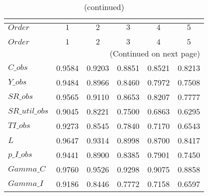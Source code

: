  
\begin{center}
\begin{longtable}{lccccc} 
\caption{COEFFICIENTS OF AUTOCORRELATION}\\
 \label{Table:th_autocorr_matrix}\\
\toprule 
$Order          $	 & 	 $         1$	 & 	 $         2$	 & 	 $         3$	 & 	 $         4$	 & 	 $         5$\\
\midrule \endfirsthead 
\caption{(continued)}\\
 \toprule \\ 
$Order          $	 & 	 $         1$	 & 	 $         2$	 & 	 $         3$	 & 	 $         4$	 & 	 $         5$\\
\midrule \endhead 
\midrule \multicolumn{6}{r}{(Continued on next page)} \\ \bottomrule \endfoot 
\bottomrule \endlastfoot 
$C\_obs         $	 & 	    0.9584	 & 	    0.9203	 & 	    0.8851	 & 	    0.8521	 & 	    0.8213 \\ 
$Y\_obs         $	 & 	    0.9484	 & 	    0.8966	 & 	    0.8460	 & 	    0.7972	 & 	    0.7508 \\ 
$SR\_obs        $	 & 	    0.9565	 & 	    0.9110	 & 	    0.8653	 & 	    0.8207	 & 	    0.7777 \\ 
$SR\_util\_obs  $	 & 	    0.9045	 & 	    0.8221	 & 	    0.7500	 & 	    0.6863	 & 	    0.6295 \\ 
$TI\_obs        $	 & 	    0.9273	 & 	    0.8545	 & 	    0.7840	 & 	    0.7170	 & 	    0.6543 \\ 
$L              $	 & 	    0.9647	 & 	    0.9314	 & 	    0.8998	 & 	    0.8700	 & 	    0.8417 \\ 
$p\_I\_obs      $	 & 	    0.9441	 & 	    0.8900	 & 	    0.8385	 & 	    0.7901	 & 	    0.7450 \\ 
$Gamma\_C       $	 & 	    0.9760	 & 	    0.9526	 & 	    0.9298	 & 	    0.9075	 & 	    0.8858 \\ 
$Gamma\_I       $	 & 	    0.9186	 & 	    0.8446	 & 	    0.7772	 & 	    0.7158	 & 	    0.6597 \\ 
\end{longtable}
 \end{center}
